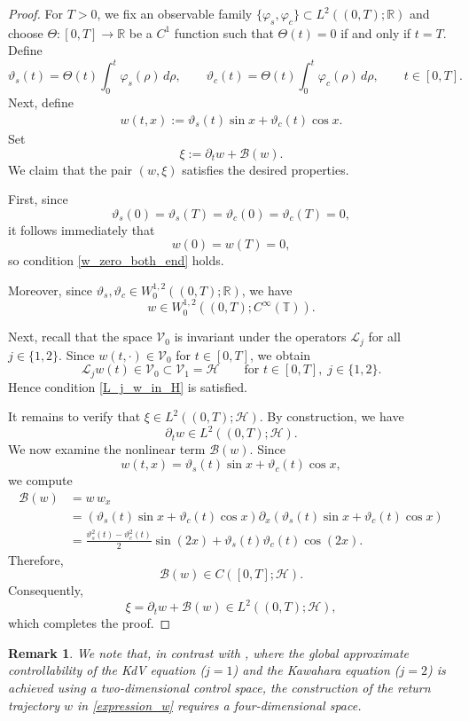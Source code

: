 \documentclass[10pt, reqno]{amsart}
\numberwithin{equation}{section}
\newtheorem{remark}{Remark}
\begin{document}
\begin{proof}
	For $T>0$, we fix an observable family $\{\varphi_s,\varphi_c\}\subset L^2((0,T);\mathbb{R})$ and choose 
	$\Theta:[0,T]\to\mathbb{R}$ be a $C^1$ function such that $\Theta(t)=0$ if and only if $t=T$. Define
	\[
	\vartheta_s(t)=\Theta(t)\int_0^t \varphi_s(\rho)\,d\rho,
	\qquad
	\vartheta_c(t)=\Theta(t)\int_0^t \varphi_c(\rho)\,d\rho,
	\qquad t\in[0,T].
	\]
	Next, define
	\begin{align}\label{expression_w}
		w(t,x):=\vartheta_s(t)\sin x+\vartheta_c(t)\cos x .
	\end{align}
	Set
	\[
	\xi:=\partial_t w+\mathcal{B}(w).
	\]
	We claim that the pair $(w,\xi)$ satisfies the desired properties.
	
	First, since
	\[
	\vartheta_s(0)=\vartheta_s(T)=\vartheta_c(0)=\vartheta_c(T)=0,
	\]
	it follows immediately that
	\[
	w(0)=w(T)=0,
	\]
	so condition \eqref{w_zero_both_end} holds.
	
	Moreover, since $\vartheta_s,\vartheta_c\in W^{1,2}_0((0,T); \mathbb{R})$, we have
	\[
	w\in W^{1,2}_0((0,T);C^\infty(\mathbb{T})).
	\]
	
	Next, recall that the space $\mathcal{V}_0$ is invariant under the operators $\mathcal{L}_j$ for all $j\in\{1,2\}$. Since $w(t,\cdot)\in\mathcal{V}_0$ for  $t\in[0,T]$, we obtain
	\[
	\mathcal{L}_j w(t)\in\mathcal{V}_0\subset\mathcal{V}_1=\mathcal{H}
	\qquad
	\text{for } t\in[0,T],\; j\in\{1,2\}.
	\]
	Hence condition \eqref{L_j_w_in_H} is satisfied.
	
	It remains to verify that $\xi\in L^2((0,T);\mathcal{H})$. By construction, we have
	\[
	\partial_t w\in L^2((0,T);\mathcal{H}).
	\]
	We now examine the nonlinear term $\mathcal{B}(w)$. Since
	\[
	w(t,x)=\vartheta_s(t)\sin x+\vartheta_c(t)\cos x,
	\]
	we compute
	\begin{align*}
		\mathcal{B}(w)
		&=w\,w_x\\
		&=\left(\vartheta_s(t)\sin x+\vartheta_c(t)\cos x\right)
		\partial_x\left(\vartheta_s(t)\sin x+\vartheta_c(t)\cos x\right)\\
		&=\frac{\vartheta_s^2(t)-\vartheta_c^2(t)}{2}\sin(2x)
		+\vartheta_s(t)\vartheta_c(t)\cos(2x).
	\end{align*}
	Therefore,
	\[
	\mathcal{B}(w)\in C([0,T];\mathcal{H}).
	\]
	Consequently,
	\[
	\xi=\partial_t w+\mathcal{B}(w)\in L^2((0,T);\mathcal{H}),
	\]
	which completes the proof.
\end{proof}

\begin{remark}
	We note that, in contrast with \cite{Chen23,Ahamed_Mondal_25}, where the global approximate controllability of the KdV equation ($j=1$) and the Kawahara equation ($j=2$) is achieved using a two-dimensional control space, the construction of the return trajectory $w$ in \eqref{expression_w} requires a four-dimensional space.
\end{remark}
\end{document}
